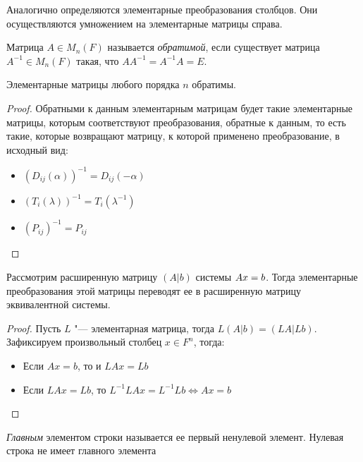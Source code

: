 \begin{note}
	Аналогично определяются элементарные преобразования столбцов. Они осуществляются умножением на элементарные матрицы справа.
\end{note}

\begin{definition}
	Матрица $A \in M_n(F)$ называется \textit{обратимой}, если существует матрица $A^{-1} \in M_n(F)$ такая, что $AA^{-1} = A^{-1}A = E$.
\end{definition}

\begin{proposition}
	Элементарные матрицы любого порядка $n$ обратимы.
\end{proposition}

\begin{proof}
	Обратными к данным элементарным матрицам будет такие элементарные матрицы, которым соответствуют преобразования, обратные к данным, то есть такие, которые возвращают матрицу, к которой применено преобразование, в исходный вид:
	\begin{itemize}
		\item $(D_{ij}(\alpha))^{-1} = D_{ij}(-\alpha)$
		\item $(T_{i}(\lambda))^{-1} = T_{i}(\lambda^{-1})$
		\item $(P_{ij})^{-1} = P_{ij}$\qedhere
	\end{itemize}
\end{proof}

\begin{corollary}
	Рассмотрим расширенную матрицу $(A|b)$ системы $Ax \hm{=} b$. Тогда элементарные преобразования этой матрицы переводят ее в расширенную матрицу эквивалентной системы.
\end{corollary}

\begin{proof}
	Пусть $L$ "--- элементарная матрица, тогда $L(A|b) = (LA|Lb)$. Зафиксируем произвольный столбец $x \in F^n$, тогда:
	\begin{itemize}
		\item Если $Ax = b$, то и $LAx = Lb$
		\item Если $LAx = Lb$, то $L^{-1}LAx = L^{-1}Lb \Leftrightarrow Ax = b$\qedhere
	\end{itemize}
\end{proof}

\begin{definition}
	\textit{Главным} элементом строки называется ее первый ненулевой элемент. Нулевая строка не имеет главного элемента
\end{definition}

